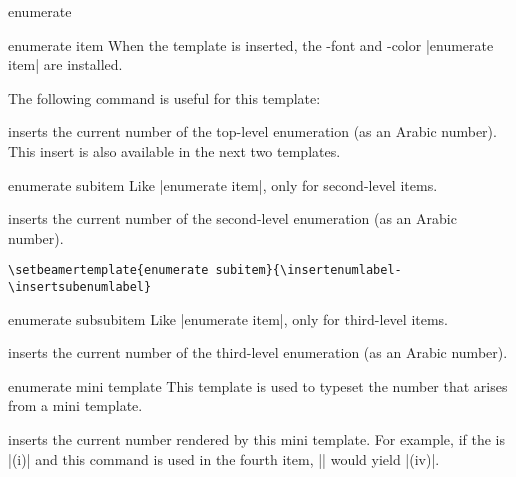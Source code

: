 \begin{environment}{{enumerate}}
\begin{element}{enumerate item}
    When the template is inserted, the \beamer-font and -color |enumerate item| are installed.

    The following command is useful for this template:
    \begin{templateinserts}
      \iteminsert{\insertenumlabel}
      inserts the current number of the top-level enumeration (as an Arabic number). This insert is also available in the next two templates.
    \end{templateinserts}
  \end{element}

  \begin{element}{enumerate subitem}\yes\yes\yes
    Like |enumerate item|, only for second-level items.

    \begin{templateinserts}
      \iteminsert{\insertsubenumlabel}
      inserts the current number of the second-level enumeration (as an Arabic number).
    \end{templateinserts}

    \example
\begin{verbatim}
\setbeamertemplate{enumerate subitem}{\insertenumlabel-\insertsubenumlabel}
\end{verbatim}
  \end{element}

  \begin{element}{enumerate subsubitem}\yes\yes\yes
    Like |enumerate item|, only for third-level items.

    \begin{templateinserts}
      \iteminsert{\insertsubsubenumlabel}
      inserts the current number of the third-level enumeration (as an Arabic number).
    \end{templateinserts}
  \end{element}

  \begin{element}{enumerate mini template}\yes\yes\yes
    This template is used to typeset the number that arises from a mini template.

    \begin{templateinserts}
      \iteminsert{\insertenumlabel}
      inserts the current number rendered by this mini template. For example, if the  is |(i)| and this command is used in the fourth item, |\insertenumlabel| would yield |(iv)|.
    \end{templateinserts}
  \end{element}
\end{environment}

